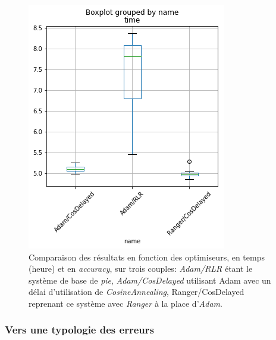\begin{figure}[ht]
\begin{minipage}[c]{0.55\linewidth}
        \includegraphics[width=1\linewidth]{figures/chap3/entrainement/boxplot_time_ranger.png}
    \end{minipage}
    \caption{Comparaison des résultats en fonction des optimiseurs, en temps (heure) et en \textit{accuracy}, sur trois couples: \textit{Adam/RLR} étant le système de base de \textit{pie}, \textit{Adam/CosDelayed} utilisant Adam avec un délai d'utilisation de \textit{CosineAnnealing}, Ranger/CosDelayed reprenant ce système avec \textit{Ranger} à la place d'\textit{Adam}. }
    \label{fig:lemmatisation:optimiseur:ranger}
\end{figure}

\subsubsection{Vers une typologie des erreurs}

